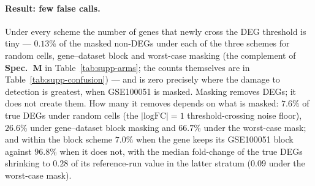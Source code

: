 \documentclass[11pt,a4paper]{article}
\begin{document}
\paragraph{Result: few false calls.}
Under every scheme the number of genes that newly cross the DEG
threshold is tiny --- $0.13\%$ of the masked non-DEGs under
each of the three schemes for random cells, gene--dataset block and
worst-case masking (the complement of \textbf{Spec.\ M} in
Table~\ref{tab:supp-arms}; the counts themselves are in
Table~\ref{tab:supp-confusion}) --- and is
zero precisely where the damage to detection is greatest, when
GSE100051 is masked.
Masking removes DEGs; it does not create them. How many it
removes depends on what is masked: $7.6\%$ of true DEGs
under random cells (the $|\text{logFC}| = 1$ threshold-crossing
noise floor), $26.6\%$ under gene--dataset block masking and
$66.7\%$ under the worst-case mask; and within the block
scheme $7.0\%$ when the gene keeps its GSE100051 block against
$96.8\%$ when it does not, with the median fold-change of the
true DEGs shrinking to $0.28$ of its reference-run value in the latter
stratum ($0.09$ under the worst-case mask).
\end{document}
